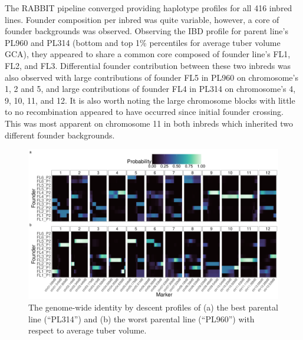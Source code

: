 The RABBIT pipeline converged providing
haplotype profiles for all 416 inbred lines. Founder composition per
inbred was quite variable, however, a core of founder backgrounds was
observed. Observing the IBD profile for parent line's PL960 and PL314
(bottom and top 1\% percentiles for average tuber volume GCA), they
appeared to share a common core composed of founder line's FL1, FL2, and
FL3. Differential founder contribution between these two inbreds was
also observed with large contributions of founder FL5 in PL960 on
chromosome's 1, 2 and 5, and large contributions of founder FL4 in PL314
on chromosome's 4, 9, 10, 11, and 12. It is also worth noting the large
chromosome blocks with little to no recombination appeared to have
occurred since initial founder crossing. This was most apparent on
chromosome 11 in both inbreds which inherited two different founder
backgrounds.

\begin{figure}

{\centering \includegraphics{./figs_05/fig-ibd-1.pdf}

}

\caption{\label{fig-ibd}The genome-wide identity by descent profiles of
(a) the best parental line (``PL314'') and (b) the worst parental line
(``PL960'') with respect to average tuber volume.}

\end{figure}

